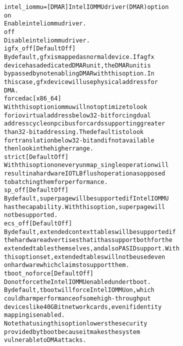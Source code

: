 \documentclass[a4paper,8pt,english]{sphinxmanual}
\begin{document}
\begin{alltt}
        intel\_iommu=    {[}DMAR{]} Intel IOMMU driver (DMAR) option
                on
                        Enable intel iommu driver.
                off
                        Disable intel iommu driver.
                igfx\_off {[}Default Off{]}
                        By default, gfx is mapped as normal device. If a gfx
                        device has a dedicated DMAR unit, the DMAR unit is
                        bypassed by not enabling DMAR with this option. In
                        this case, gfx device will use physical address for
                        DMA.
                forcedac {[}x86\_64{]}
                        With this option iommu will not optimize to look
                        for io virtual address below 32-bit forcing dual
                        address cycle on pci bus for cards supporting greater
                        than 32-bit addressing. The default is to look
                        for translation below 32-bit and if not available
                        then look in the higher range.
                strict {[}Default Off{]}
                        With this option on every unmap\_single operation will
                        result in a hardware IOTLB flush operation as opposed
                        to batching them for performance.
                sp\_off {[}Default Off{]}
                        By default, super page will be supported if Intel IOMMU
                        has the capability. With this option, super page will
                        not be supported.
                ecs\_off {[}Default Off{]}
                        By default, extended context tables will be supported if
                        the hardware advertises that it has support both for the
                        extended tables themselves, and also PASID support. With
                        this option set, extended tables will not be used even
                        on hardware which claims to support them.
                tboot\_noforce {[}Default Off{]}
                        Do not force the Intel IOMMU enabled under tboot.
                        By default, tboot will force Intel IOMMU on, which
                        could harm performance of some high-throughput
                        devices like 40GBit network cards, even if identity
                        mapping is enabled.
                        Note that using this option lowers the security
                        provided by tboot because it makes the system
                        vulnerable to DMA attacks.


\end{alltt}
\end{document}
